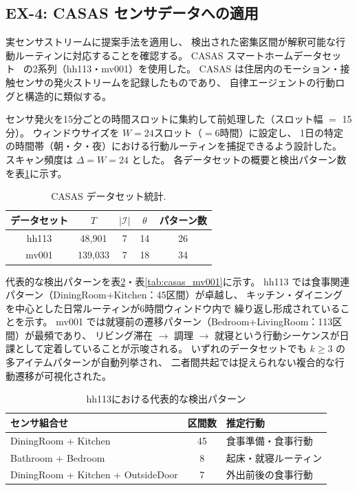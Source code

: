\subsection{EX-4: CASAS センサデータへの適用}\label{sec:ex4}

実センサストリームに提案手法を適用し、
検出された密集区間が解釈可能な行動ルーティンに対応することを確認する。
CASAS スマートホームデータセット~\cite{casas2013} の2系列（hh113・mv001）を使用した。
CASAS は住居内のモーション・接触センサの発火ストリームを記録したものであり、
自律エージェントの行動ログと構造的に類似する。

センサ発火を15分ごとの時間スロットに集約して前処理した（スロット幅 $=$ 15分）。
ウィンドウサイズを $W = 24$スロット（$= 6$時間）に設定し、
1日の特定の時間帯（朝・夕・夜）における行動ルーティンを捕捉できるよう設計した。
スキャン頻度は $\Delta = W = 24$ とした。
各データセットの概要と検出パターン数を表\ref{tab:casas_stats}に示す。

\begin{table}[t]
\caption{CASAS データセット統計.}
\label{tab:casas_stats}
\begin{center}
\begin{tabular}{ccccc}
\hline
データセット & $T$ & $|\mathcal{I}|$ & $\theta$ & パターン数 \\\hline
hh113 & 48{,}901 & 7 & 14 & 26 \\
mv001 & 139{,}033 & 7 & 18 & 34 \\\hline
\end{tabular}
\end{center}
\end{table}

代表的な検出パターンを表\ref{tab:casas_hh113}・表\ref{tab:casas_mv001}に示す。
hh113 では食事関連パターン（DiningRoom+Kitchen：45区間）が卓越し、
キッチン・ダイニングを中心とした日常ルーティンが6時間ウィンドウ内で
繰り返し形成されていることを示す。
mv001 では就寝前の遷移パターン（Bedroom+LivingRoom：113区間）が最頻であり、
リビング滞在 $\to$ 調理 $\to$ 就寝という行動シーケンスが日課として定着していることが示唆される。
いずれのデータセットでも $k \geq 3$ の多アイテムパターンが自動列挙され、
二者間共起では捉えられない複合的な行動遷移が可視化された。

\begin{table}[t]
\caption{hh113における代表的な検出パターン}
\label{tab:casas_hh113}
\begin{center}
\footnotesize
\begin{tabular}{p{3.5cm}cp{2.0cm}}
\hline
センサ組合せ & 区間数 & 推定行動 \\\hline
DiningRoom + Kitchen              & 45 & 食事準備・食事行動 \\
Bathroom + Bedroom                &  8 & 起床・就寝ルーティン \\
DiningRoom + Kitchen + OutsideDoor &  7 & 外出前後の食事行動 \\\hline
\end{tabular}
\end{center}
\end{table}


